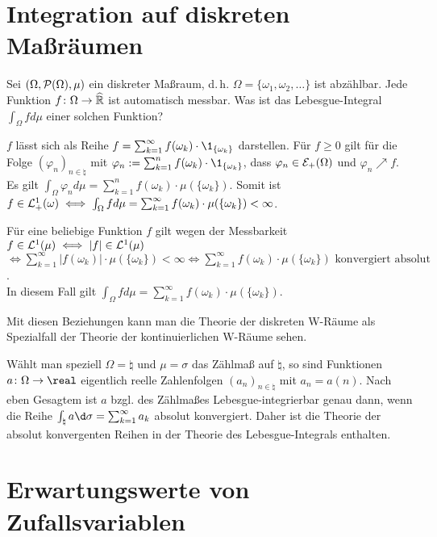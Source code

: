 \section{%
    Integration auf diskreten Maßräumen%
}

\begin{Bem}
    Sei $(\Omega, \P(\Omega), \mu)$ ein diskreter Maßraum, d.\,h.
    $\Omega = \{\omega_1, \omega_2, \dotsc\}$ ist abzählbar.
    Jede Funktion $f\colon \Omega \rightarrow \extreal$ ist automatisch messbar.
    Was ist das Lebesgue-Integral $\int_\Omega f d\mu$ einer solchen Funktion?

    $f$ lässt sich als Reihe $f = \sum_{k=1}^\infty f(\omega_k) \cdot \1_{\{\omega_k\}}$
    darstellen.
    Für $f \ge 0$ gilt für die Folge $(\varphi_n)_{n \in \natural}$ mit
    $\varphi_n := \sum_{k=1}^n f(\omega_k) \cdot \1_{\{\omega_k\}}$,
    dass $\varphi_n \in \E_+(\Omega)$ und $\varphi_n \nearrow f$.
    Es gilt $\int_\Omega \varphi_n d\mu = \sum_{k=1}^n f(\omega_k) \cdot \mu(\{\omega_k\})$.
    Somit ist $f \in \L^1_+(\omega) \iff
    \int_\Omega f d\mu = \sum_{k=1}^\infty f(\omega_k) \cdot \mu(\{\omega_k\}) < \infty$.

    Für eine beliebige Funktion $f$ gilt wegen der Messbarkeit
    $f \in \L^1(\mu) \iff |f| \in \L^1(\mu)$
    $\iff \sum_{k=1}^\infty |f(\omega_k)| \cdot \mu(\{\omega_k\}) < \infty \iff
    \sum_{k=1}^\infty f(\omega_k) \cdot \mu(\{\omega_k\}) \text{ konvergiert absolut}$.\\
    In diesem Fall gilt
    $\int_\Omega f d\mu = \sum_{k=1}^\infty f(\omega_k) \cdot \mu(\{\omega_k\})$.

    Mit diesen Beziehungen kann man die Theorie der diskreten W-Räume als Spezialfall der Theorie
    der kontinuierlichen W-Räume sehen.

    Wählt man speziell $\Omega = \natural$ und $\mu = \sigma$ das Zählmaß auf $\natural$,
    so sind Funktionen $a\colon \Omega \rightarrow \real$ eigentlich reelle Zahlenfolgen
    $(a_n)_{n \in \natural}$ mit $a_n = a(n)$.
    Nach eben Gesagtem ist $a$ bzgl. des Zählmaßes Lebesgue-integrierbar genau dann, wenn
    die Reihe $\int_\natural a \d\sigma = \sum_{k=1}^\infty a_k$ absolut konvergiert.
    Daher ist die Theorie der absolut konvergenten Reihen in der Theorie des
    Lebesgue-Integrals enthalten.
\end{Bem}

\pagebreak

\section{%
    Erwartungswerte von Zufallsvariablen%
}

